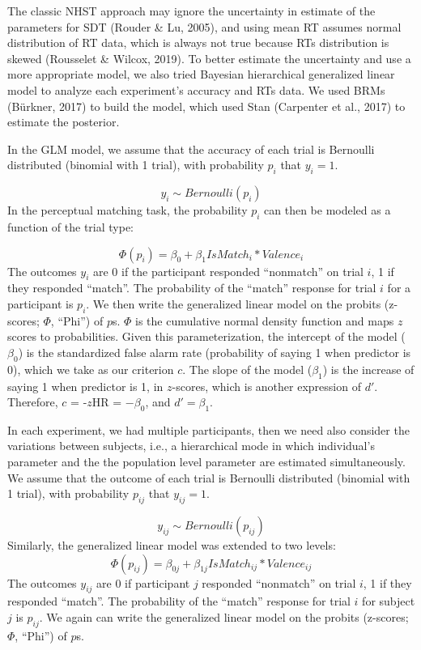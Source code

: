 \documentclass[
  english,
  man]{apa6}
\begin{document}
The classic NHST approach may ignore the uncertainty in estimate of the parameters for SDT (Rouder \& Lu, 2005), and using mean RT assumes normal distribution of RT data, which is always not true because RTs distribution is skewed (Rousselet \& Wilcox, 2019). To better estimate the uncertainty and use a more appropriate model, we also tried Bayesian hierarchical generalized linear model to analyze each experiment's accuracy and RTs data. We used BRMs (Bürkner, 2017) to build the model, which used Stan (Carpenter et al., 2017) to estimate the posterior.

In the GLM model, we assume that the accuracy of each trial is Bernoulli distributed (binomial with 1 trial), with probability \(p_{i}\) that \(y_{i} = 1\).

\[ y_{i} \sim Bernoulli(p_{i})\]
In the perceptual matching task, the probability \(p_{i}\) can then be modeled as a function of the trial type:

\[ \Phi(p_{i}) =  \beta_{0} + \beta_{1}IsMatch_{i}  * Valence_{i} \]
The outcomes \(y_{i}\) are 0 if the participant responded \enquote{nonmatch} on trial \(i\), 1 if they responded \enquote{match}. The probability of the \enquote{match} response for trial \(i\) for a participant is \(p_{i}\). We then write the generalized linear model on the probits (z-scores; \(\Phi\), \enquote{Phi}) of \(p\)s. \(\Phi\) is the cumulative normal density function and maps \(z\) scores to probabilities. Given this parameterization, the intercept of the model (\(\beta_0\)) is the standardized false alarm rate (probability of saying 1 when predictor is 0), which we take as our criterion \(c\). The slope of the model (\(\beta_1\)) is the increase of saying 1 when predictor is 1, in \(z\)-scores, which is another expression of \(d'\). Therefore, \(c\) = -\(z\)HR = \(-\beta_0\), and \(d' = \beta_1\).

In each experiment, we had multiple participants, then we need also consider the variations between subjects, i.e., a hierarchical mode in which individual's parameter and the the population level parameter are estimated simultaneously. We assume that the outcome of each trial is Bernoulli distributed (binomial with 1 trial), with probability \(p_{ij}\) that \(y_{ij} = 1\).

\[ y_{ij} \sim Bernoulli(p_{ij})\]
Similarly, the generalized linear model was extended to two levels:
\[ \Phi(p_{ij}) =  \beta_{0j} + \beta_{1j}IsMatch_{ij} * Valence_{ij}\]
The outcomes \(y_{ij}\) are 0 if participant \(j\) responded \enquote{nonmatch} on trial \(i\), 1 if they responded \enquote{match}. The probability of the \enquote{match} response for trial \(i\) for subject \(j\) is \(p_{ij}\). We again can write the generalized linear model on the probits (z-scores; \(\Phi\), \enquote{Phi}) of \(p\)s.
\end{document}
